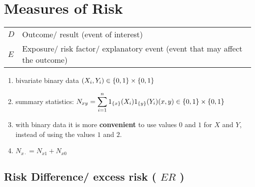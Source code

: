 \section{Measures of Risk \cite{ism-1}} \label{Measures of Risk}

\begin{customTableWrapper}{1.5}
\begin{table}[H]
    \centering
    \begin{tabular}{l p{7cm}}
        $D$ & Outcome/ result (event of interest) \\
        
        $E$ & Exposure/ risk factor/ explanatory event (event that may affect the outcome)\\
    \end{tabular}
\end{table}
\end{customTableWrapper}

\begin{enumerate}[itemsep=0.2cm]
    \item bivariate binary data $(X_i, Y_i) \in \left\{0, 1\right\} \times \left\{0, 1\right\}$

    \item summary statistics:
    $
        N_{xy}
        = \dsum_{i=1}^n 1_{\dCurlyBrac{x}}(X_i)1_{\dCurlyBrac{y}}(Y_i)
        \hfill
        (x, y) \in \dCurlyBrac{0, 1}\times\dCurlyBrac{0, 1}
    $

    \item with binary data it is more \textbf{convenient} to use values $0$ and $1$ for $X$ and $Y$, instead of using the values $1$ and $2$.

    \item $N_{x\cdot} = N_{x1} + N_{x0}$ 
\end{enumerate}


\subsection{Risk Difference/ excess risk ( $ER$ ) \cite{ism-1}} \label{Risk Difference/ excess risk}

